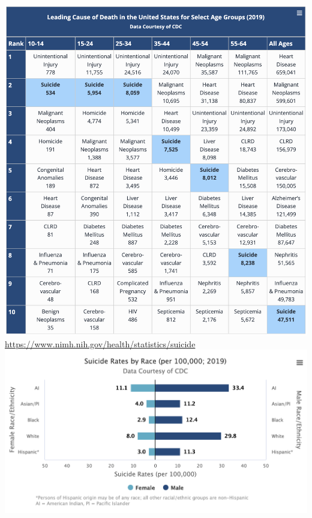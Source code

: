 \documentclass[nobackground,dvipsnames,table,aspectratio=169]{beamer}
\begin{document}
\begin{frame}{}
    \begin{columns}
            \includegraphics[width=\textwidth]{leading-causes-of-death-suicide-2019}
            \tiny
            \url{https://www.nimh.nih.gov/health/statistics/suicide}
            \includegraphics[width=\textwidth]{suicide-rates-by-race}
    \end{columns}
\end{frame}
\end{document}
